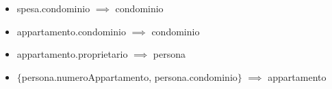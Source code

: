 
\begin{itemize}
	\item spesa.condominio $\implies$ condominio
	\item appartamento.condominio $\implies$ condominio
	\item appartamento.proprietario $\implies$ persona
	\item $\{$persona.numeroAppartamento, persona.condominio$\}$ $\implies$ appartamento
\end{itemize}

